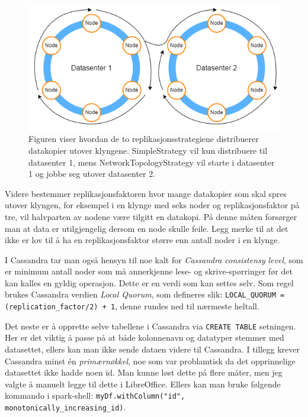 \FigureCounter
\begin{figure}[H]
  \centering
  \includegraphics[scale=0.5]{images/milepael6/replicationstrategy.drawio.png}
  \caption{Figuren viser hvordan de to replikasjonsstrategiene distribuerer datakopier utover klyngene. SimpleStrategy vil kun distribuere til datasenter 1, mens NetworkTopologyStrategy vil starte i datasenter 1 og jobbe seg utover datasenter 2.}
\end{figure}

Videre bestemmer replikasjonsfaktoren hvor mange datakopier som skal spres utover klyngen, for eksempel i en klynge med seks noder og replikasjonsfaktor på tre, vil halvparten av nodene være tilgitt en datakopi. På denne måten forsørger man at data er utilgjengelig dersom en node skulle feile. Legg merke til at det ikke er lov til å ha en replikasjonsfaktor større enn antall noder i en klynge. 

I Cassandra tar man også hensyn til noe kalt for \textit{Cassandra consistensy level}, som er minimum antall noder som må annerkjenne lese- og skrive-spørringer før det kan kalles en gyldig operasjon. Dette er en verdi som kan settes selv. Som regel brukes Cassandra verdien \textit{Local Quorum}, som defineres slik: \lstinline{LOCAL_QUORUM = (replication_factor/2) + 1}, denne rundes ned til nærmeste heltall.

Det neste er å opprette selve tabellene i Cassandra via \lstinline{CREATE TABLE} setningen. Her er det viktig å passe på at både kolonnenavn og datatyper stemmer med datasettet, ellers kan man ikke sende dataen videre til Cassandra. I tillegg krever Cassandra minst én \textit{primærnøkkel}, noe som var problamtisk da det opprinnelige datasettet ikke hadde noen id. Man kunne løst dette på flere måter, men jeg valgte å manuelt legge til dette i LibreOffice. Ellers kan man bruke følgende kommando i spark-shell: \lstinline{myDf.withColumn("id", monotonically_increasing_id)}.

